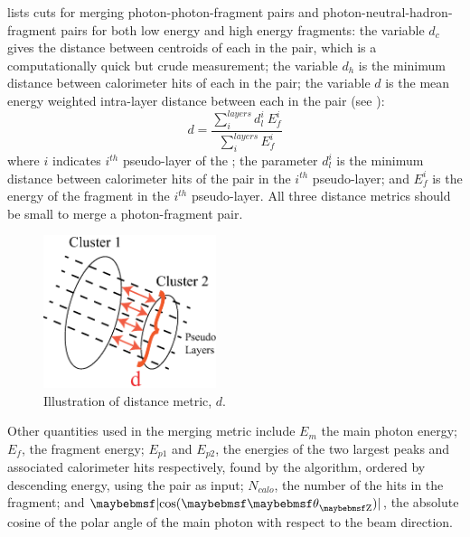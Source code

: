  lists cuts for merging photon-photon-fragment pairs and photon-neutral-hadron-fragment pairs for both low energy and high energy fragments: the variable $d_c$ gives the distance between centroids of each \PFO in the pair, which is a computationally quick but crude measurement;  the variable  $d_h$ is the minimum distance between calorimeter hits of each \PFO in the pair;  the variable  $d$ is the mean energy weighted intra-layer distance between  each \PFO in the pair (see ):
\begin{equation}
d = \frac{\sum_{i}^{layers}d_l^i \ E_{f}^i}{\sum_{i}^{layers}E_{f}^i}
\end{equation}
where $i$ indicates $i^{th}$ pseudo-layer of the \ECAL; the parameter $d_{l}^i$ is the minimum distance between calorimeter hits of the pair in the $i^{th}$ pseudo-layer; and $E_{f}^i$ is the energy of the fragment in the $i^{th}$ pseudo-layer.  All three distance metrics should be small to merge a photon-fragment pair.
\begin{figure}[tbph]
\centering
\includegraphics[width=0.45\textwidth]{photon/dLayer}
\caption{Illustration of distance metric, $d$.}
\label{fig:photonDistanceMetric}
\end{figure}

Other quantities used in the merging metric include $E_m$ the main photon energy; $E_f$,  the fragment energy; $E_{p1}$ and $E_{p2}$, the energies of the two largest peaks and associated calorimeter hits respectively, found by the \peakFinding algorithm, ordered by descending energy, using the pair as input; $N_{calo}$, the number of the \ECAL hits in the fragment; and $\absCosTheta$, the absolute cosine of the polar angle of the main photon with respect to the beam direction.


